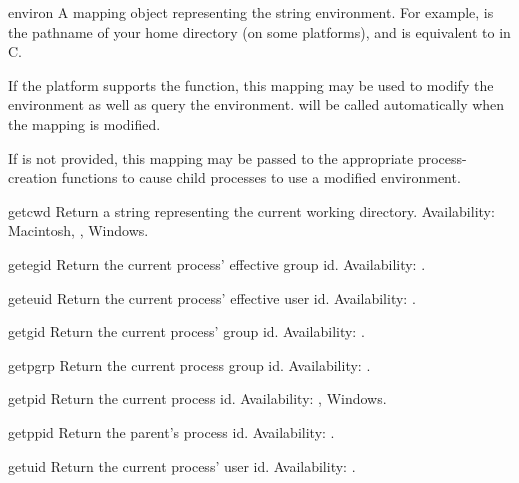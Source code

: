 \begin{datadesc}{environ}
A mapping object representing the string environment. For example,
 is the pathname of your home directory (on some
platforms), and is equivalent to  in C.

If the platform supports the  function, this
mapping may be used to modify the environment as well as query the
environment.   will be called automatically when
the mapping is modified.

If  is not provided, this mapping may be passed to
the appropriate process-creation functions to cause child processes to 
use a modified environment.
\end{datadesc}

\begin{funcdesc}{getcwd}{}
Return a string representing the current working directory.
Availability: Macintosh, \UNIX{}, Windows.
\end{funcdesc}

\begin{funcdesc}{getegid}{}
Return the current process' effective group id.
Availability: \UNIX{}.
\end{funcdesc}

\begin{funcdesc}{geteuid}{}
Return the current process' effective user id.
Availability: \UNIX{}.
\end{funcdesc}

\begin{funcdesc}{getgid}{}
Return the current process' group id.
Availability: \UNIX{}.
\end{funcdesc}

\begin{funcdesc}{getpgrp}{}
Return the current process group id.
Availability: \UNIX{}.
\end{funcdesc}

\begin{funcdesc}{getpid}{}
Return the current process id.
Availability: \UNIX{}, Windows.
\end{funcdesc}

\begin{funcdesc}{getppid}{}
Return the parent's process id.
Availability: \UNIX{}.
\end{funcdesc}

\begin{funcdesc}{getuid}{}
Return the current process' user id.
Availability: \UNIX{}.
\end{funcdesc}

